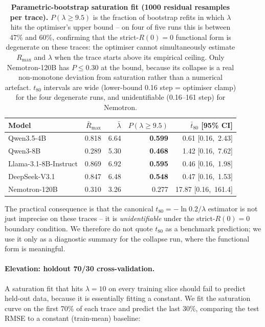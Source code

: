 \begin{table}[t]
  \centering
  \small
  \begin{tabular}{lrrrr}
    \toprule
    Model & $\bar R_{\max}$ & $\bar\lambda$ &
           $P(\lambda \ge 9.5)$ & $\bar t_{80}$ [95\% CI] \\
    \midrule
    Qwen3.5-4B            & 0.818 & 6.64 & \textbf{0.599} & 0.61 [0.16,\ 2.43] \\
    Qwen3-8B              & 0.289 & 5.30 & \textbf{0.468} & 1.42 [0.16,\ 7.62] \\
    Llama-3.1-8B-Instruct & 0.869 & 6.92 & \textbf{0.595} & 0.46 [0.16,\ 1.98] \\
    DeepSeek-V3.1         & 0.847 & 6.48 & \textbf{0.548} & 0.47 [0.16,\ 1.53] \\
    Nemotron-120B         & 0.310 & 3.26 & 0.277          & 17.87 [0.16,\ 161.4] \\
    \bottomrule
  \end{tabular}
  \caption{\textbf{Parametric-bootstrap saturation fit (1000 residual
    resamples per trace).}  $P(\lambda \ge 9.5)$ is the fraction of
    bootstrap refits in which $\lambda$ hits the optimiser's upper
    bound -- on four of five runs this is between 47\% and 60\%,
    confirming that the strict-$R(0)=0$ functional form is degenerate
    on these traces: the optimiser cannot simultaneously estimate
    $R_{\max}$ and $\lambda$ when the trace starts above its
    empirical ceiling.  Only Nemotron-120B has $P \le 0.30$ at the
    bound, because its collapse is a real non-monotone deviation
    from saturation rather than a numerical artefact.  $t_{80}$
    intervals are wide (lower-bound 0.16 step = optimiser clamp) for
    the four degenerate runs, and unidentifiable (0.16--161 step)
    for Nemotron.}
  \label{tab:scaling-bootstrap}
\end{table}

The practical consequence is that the canonical $t_{80} = -\ln 0.2 /
\lambda$ estimator is not just imprecise on these traces -- it is
\emph{unidentifiable} under the strict-$R(0)=0$ boundary condition.
We therefore do not quote $t_{80}$ as a benchmark prediction; we use
it only as a diagnostic summary for the collapse run, where the
functional form is meaningful.

\paragraph{Elevation: holdout 70/30 cross-validation.}
\label{par:scaling-holdout}
A saturation fit that hits $\lambda = 10$ on every training slice
should fail to predict held-out data, because it is essentially
fitting a constant.  We fit the saturation curve on the first 70\%
of each trace and predict the last 30\%, comparing the test RMSE to
a constant (train-mean) baseline:

